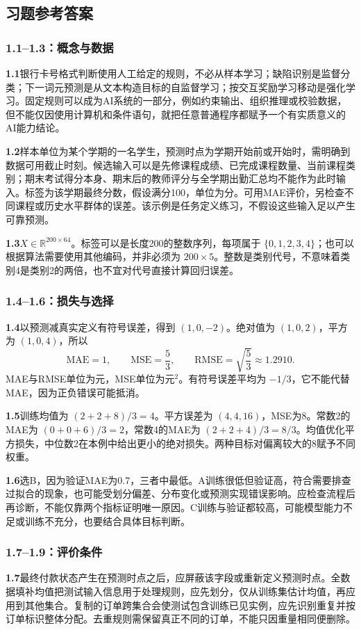 \documentclass[UTF8,fontset=none,zihao=-4,a4paper]{ctexart}
\numberwithin{equation}{section}
\numberwithin{figure}{section}
\begin{document}
\clearpage
\subsection{习题参考答案}
\subsubsection*{1.1--1.3：概念与数据}
\textbf{1.1}\quad 银行卡号格式判断使用人工给定的规则，不必从样本学习；缺陷识别是监督分类；下一词元预测是从文本构造目标的自监督学习；按交互奖励学习移动是强化学习。固定规则可以成为AI系统的一部分，例如约束输出、组织推理或校验数据，但不能仅因使用计算机和条件语句，就把任意普通程序都赋予一个有实质意义的AI能力结论。

\textbf{1.2}\quad 样本单位为某个学期的一名学生，预测时点为学期开始前或开始时，需明确到数据可用截止时刻。候选输入可以是先修课程成绩、已完成课程数量、当前课程类别；期末考试得分本身、期末后的教师评分与全学期出勤汇总均不能作为此时输入。标签为该学期最终分数，假设满分100，单位为分。可用MAE评价，另检查不同课程或历史水平群体的误差。该示例是任务定义练习，不假设这些输入足以产生可靠预测。

\textbf{1.3}\quad $X\in\mathbb R^{200\times64}$。标签可以是长度200的整数序列，每项属于 $\{0,1,2,3,4\}$；也可以根据算法需要使用其他编码，并非必须为 $200\times5$。整数是类别代号，不意味着类别4是类别2的两倍，也不宜对代号直接计算回归误差。

\subsubsection*{1.4--1.6：损失与选择}
\textbf{1.4}\quad 以预测减真实定义有符号误差，得到 $(1,0,-2)$。绝对值为 $(1,0,2)$，平方为 $(1,0,4)$，所以
\[
 \mathrm{MAE}=1,
 \qquad\mathrm{MSE}=\frac53,
 \qquad\mathrm{RMSE}=\sqrt{\frac53}\approx1.2910.
\]
MAE与RMSE单位为元，MSE单位为元$^2$。有符号误差平均为 $-1/3$，它不能代替MAE，因为正负错误可能抵消。

\textbf{1.5}\quad 训练均值为 $(2+2+8)/3=4$。平方误差为 $(4,4,16)$，MSE为8。常数2的MAE为 $(0+0+6)/3=2$，常数4的MAE为 $(2+2+4)/3=8/3$。均值优化平方损失，中位数2在本例中给出更小的绝对损失。两种目标对偏离较大的8赋予不同权重。

\textbf{1.6}\quad 选B，因为验证MAE为0.7，三者中最低。A训练很低但验证高，符合需要排查过拟合的现象，也可能受划分偏差、分布变化或预测实现错误影响。应检查流程后再诊断，不能仅靠两个指标证明唯一原因。C训练与验证都较高，可能模型能力不足或训练不充分，也要结合具体目标判断。

\subsubsection*{1.7--1.9：评价条件}
\textbf{1.7}\quad 最终付款状态产生在预测时点之后，应屏蔽该字段或重新定义预测时点。全数据填补均值把测试输入信息用于处理规则，应先划分，仅从训练集估计均值，再应用到其他集合。复制的订单跨集合会使测试包含训练已见实例，应先识别重复并按订单标识整体分配。去重规则需保留真正不同的订单，不能只因重量相同便删除。
\end{document}
